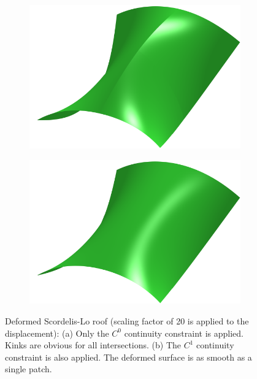 \documentclass[preprint,12pt]{elsarticle}
\theoremstyle{remark}
\begin{document}
\begin{figure}[!hbt]
    \centering
    \captionsetup[subfigure]{font = footnotesize}
    \begin{subfigure}[b]{.49\textwidth}
        \centering
        \includegraphics[width = \textwidth]{roof_c0_result}
        \caption{}
    \end{subfigure}
    \begin{subfigure}[b]{.49\textwidth}
        \centering
        \includegraphics[width = \textwidth]{roof_c1_result}
        \caption{}
    \end{subfigure}
	\caption{Deformed Scordelis-Lo roof (scaling factor of 20 is applied to the displacement): (a) Only the $C^0$ continuity constraint is applied. Kinks are obvious for all intersections. (b) The $C^1$ continuity constraint is also applied. The deformed surface is as smooth as a single patch.}\label{fig:scordelis_deform}
\end{figure}
\end{document}

